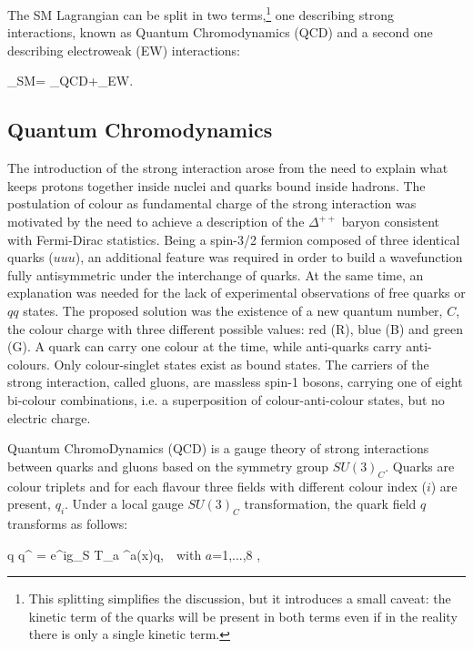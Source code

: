 \noindent The SM Lagrangian can be split in two terms,\footnote{This splitting simplifies the discussion, but it introduces a small caveat: the kinetic term of the quarks will be present in both terms even if in the reality there is only a single kinetic term.} one describing strong interactions, known as Quantum Chromodynamics (QCD) and a second one describing electroweak (EW) interactions:

\be
{}_{\rm SM}= _{\rm QCD}+_{\rm EW}.
\ee

\subsection{Quantum Chromodynamics}

The introduction of the strong interaction arose from the need to explain what keeps protons together inside nuclei and quarks bound inside hadrons. The postulation of colour as fundamental charge of the strong interaction was motivated by the need to achieve a description of the $\Delta^{++}$ baryon consistent with Fermi-Dirac statistics. Being a spin-3/2 fermion composed of three identical quarks ($uuu$), an additional feature was required in order to build a wavefunction fully antisymmetric under the interchange of quarks. At the same time, an explanation was needed for the lack of experimental observations of free quarks or $qq$ states. The proposed solution was the existence of a new quantum number, $C$, the colour charge with three different possible values: red (R), blue (B) and green (G). A quark can carry one colour at the time, while anti-quarks carry anti-colours. Only colour-singlet states exist as bound states. The carriers of the strong interaction, called gluons, are massless spin-1 bosons, carrying one of eight bi-colour combinations, i.e. a superposition of colour-anti-colour states, but no electric charge. \par
Quantum ChromoDynamics (QCD) is a gauge theory of strong interactions between quarks and gluons based on the symmetry group $SU(3)_{C}$. Quarks are colour triplets and for each flavour three fields with different colour index ($i$) are present, $q_{i}$. Under a local gauge $SU(3)_{C}$ transformation, the quark field $q$ transforms as follows:

\be
q \to q^{\prime} = e^{ig_S T_a \cdot \theta^{a}(x)}q, \,\, \textrm{with $a$=1,...,8 ,} 
\ee


